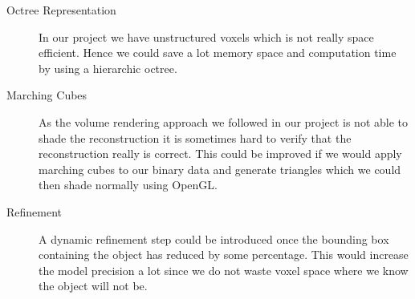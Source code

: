\documentclass[10pt,twocolumn,letterpaper]{article}
\begin{document}
\begin{description}
	\item[Octree Representation] In our project we have unstructured voxels which is not really space efficient. Hence we could save a lot memory space and computation time by using a hierarchic octree.
	\item[Marching Cubes] As the volume rendering approach we followed in our project is not able to shade the reconstruction it is sometimes hard to verify that the reconstruction really is correct. This could be improved if we would apply marching cubes to our binary data and generate triangles which we could then shade normally using OpenGL.
	\item[Refinement] A dynamic refinement step could be introduced once the bounding box containing the object has reduced by some percentage. This would increase the model precision a lot since we do not waste voxel space where we know the object will not be.
\end{description}


{\small


}
\end{document}
